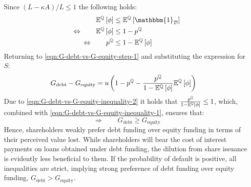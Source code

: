 \documentclass[main.tex]{subfiles}
\begin{document}
        Since $(L-\kappa A) / L \leq 1$ the following holds:
            \begin{align}
                    \mathbb{E}^{\rnmeasure}\left[\phi\right]
                &\leq
                    \mathbb{E}^{\rnmeasure}\left[\mathbbm{1}_{\mathcal{D}} \right]
                \nonumber \\
                \Leftrightarrow 
                \qquad
                    \mathbb{E}^{\rnmeasure}\left[\phi\right]
                &\leq
                    1 - p^{\rnmeasure}
                \label{eqn:G-debt-vs-G-equity-inequality-1}
                \\
                \Leftrightarrow 
                \qquad
                p^{\rnmeasure}
                &\leq 
                1 - \mathbb{E}^{\rnmeasure}\left[\phi\right]
                \label{eqn:G-debt-vs-G-equity-inequality-2}
            \end{align}
        Returning to \cref{eqn:G-debt-vs-G-equity-step-1} and substituting the expression for $S$:
            \begin{align}
                G_{\text{debt}}
                -
                G_{\text{equity}}
                &=
                    u \left(
                        1
                        -
                        p^{\mathbb{Q}}
                        -
                        \frac{
                            p^{\mathbb{Q}}
                        }{
                            1
                            -
                            \mathbb{E}^{\mathbb{Q}}\left[\phi\right]
                        } 
                        \mathbb{E}^{\mathbb{Q}}\left[\phi\right]
                    \right)
                \nonumber
            \end{align}
        Due to \cref{eqn:G-debt-vs-G-equity-inequality-2} it holds that
        $\frac{p^{\mathbb{Q}}}{1-\mathbb{E}^{\mathbb{Q}}\left[\phi\right]} \leq 1$,
        which, combined with \cref{eqn:G-debt-vs-G-equity-inequality-1}, ensures that:
            \begin{equation}
                \Rightarrow 
                \qquad
                G_{\text{debt}}
                \geq 
                G_{\text{equity}}
                \label{eqn:G-debt-vs-G-equity}
            \end{equation}
        Hence, shareholders weakly prefer debt funding over equity funding in terms of their perceived value lost.
        While shareholders will bear the cost of interest payments on loans obtained under debt funding,
        the dilution from share issuance is evidently less beneficial to them. 
        If the probability of default is positive, all inequalities are strict,
        implying strong preference of debt funding over equity funding, $G_{\text{debt}} > G_{\text{equity}}$.
        
\end{document}
